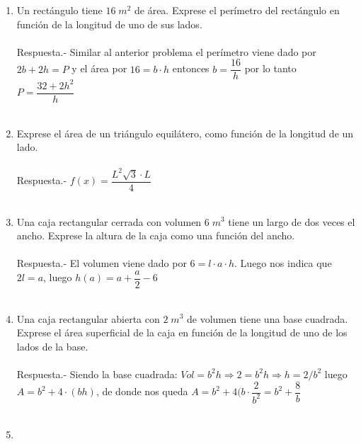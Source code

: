 \begin{enumerate}
    \item Un rectángulo tiene $16\; m^2$  de área. Exprese el perímetro del rectángulo en función de la longitud de uno de sus lados.\\\\
	Respuesta.-\; Similar al anterior problema el perímetro viene dado por $2b+2h=P$  y el área por $16=b\cdot h$ entonces $b=\dfrac{16}{h}$ por lo tanto $P=\dfrac{32+2h^2}{h}$\\\\ 

    \item Exprese el área de un triángulo equilátero, como función de la longitud de un lado.\\\\
	Respuesta.-\; $f(x)=\dfrac{L^2 \sqrt{3}\cdot L}{4}$\\\\

    \item Una caja rectangular cerrada con volumen $6\; m^3$ tiene un largo de dos veces el ancho. Exprese la altura de la caja como una función del ancho.\\\\
	Respuesta.-\; El volumen viene dado por $6=l\cdot a \cdot h$. Luego nos indica que $2l=a$, luego $h(a)=a + \dfrac{a}{2} - 6$\\\\

    \item Una caja rectangular abierta con $2 \; m^3$  de volumen tiene una base cuadrada. Exprese el área superficial de la caja en función de la longitud de uno de los lados de la base.\\\\
	Respuesta.-\; Siendo la base cuadrada:  $Vol=b^2h \Longrightarrow  2=b^2h \Longrightarrow  h=2/b^2$ luego $A=b^2 + 4\cdot (bh)$, de donde nos queda $A=b^2 + 4(b \cdot \dfrac{2}{b^2} = b^2 + \dfrac{8}{b}$\\\\

    \item 


    \end{enumerate}
